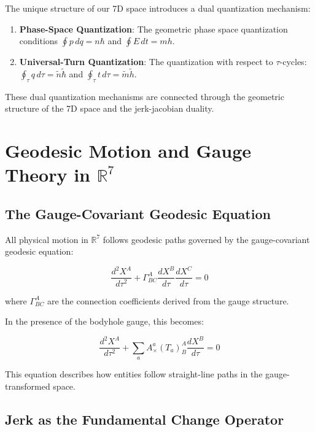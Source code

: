 \documentclass{article}
\begin{document}
The unique structure of our 7D space introduces a dual quantization mechanism:

\begin{enumerate}
\item \textbf{Phase-Space Quantization}: The geometric phase space quantization conditions $\oint p \, dq = n\hbar$ and $\oint E \, dt = mh$.
\item \textbf{Universal-Turn Quantization}: The quantization with respect to $\tau$-cycles: $\oint_\tau q \, d\tau = \tilde{n}\tilde{\hbar}$ and $\oint_\tau t \, d\tau = \tilde{m}\tilde{h}$.
\end{enumerate}

These dual quantization mechanisms are connected through the geometric structure of the 7D space and the jerk-jacobian duality.

\section{Geodesic Motion and Gauge Theory in $\mathbb{R}^7$}

\subsection{The Gauge-Covariant Geodesic Equation}

All physical motion in $\mathbb{R}^7$ follows geodesic paths governed by the gauge-covariant geodesic equation:

\begin{equation}
\frac{d^2 X^A}{d\tau^2} + \Gamma^A_{BC} \frac{dX^B}{d\tau} \frac{dX^C}{d\tau} = 0
\end{equation}

where $\Gamma^A_{BC}$ are the connection coefficients derived from the gauge structure.

In the presence of the bodyhole gauge, this becomes:

\begin{equation}
\frac{d^2 X^A}{d\tau^2} + \sum_a A^a_\times (T_a)^A_B \frac{dX^B}{d\tau} = 0
\end{equation}

This equation describes how entities follow straight-line paths in the gauge-transformed space.

\subsection{Jerk as the Fundamental Change Operator}
\end{document}
